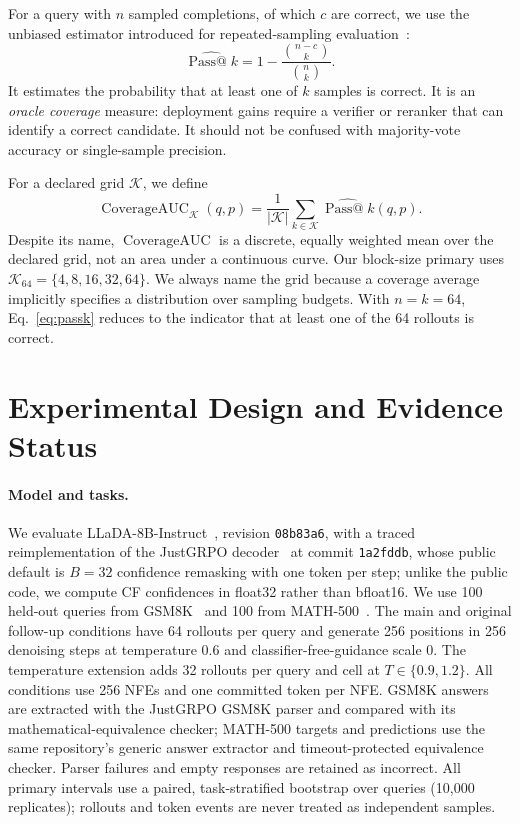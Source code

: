 \documentclass[11pt]{article}
\newcommand{\cauc}{\operatorname{CoverageAUC}}
\newcommand{\model}{LLaDA-8B-Instruct}
\newcommand{\gsm}{GSM8K}
\newcommand{\mathfive}{MATH-500}
\begin{document}
For a query with $n$ sampled completions, of which $c$ are correct, we use the unbiased estimator introduced for repeated-sampling evaluation~\citep{chen2021codex}:
\begin{equation}
  \widehat{\operatorname{Pass@}k}
  = 1-\frac{\binom{n-c}{k}}{\binom{n}{k}}.
  \label{eq:passk}
\end{equation}
It estimates the probability that at least one of $k$ samples is correct. It is an \emph{oracle coverage} measure: deployment gains require a verifier or reranker that can identify a correct candidate. It should not be confused with majority-vote accuracy or single-sample precision.

For a declared grid $\mathcal{K}$, we define
\begin{equation}
  \cauc_{\mathcal{K}}(q,p)=\frac{1}{|\mathcal{K}|}\sum_{k\in\mathcal{K}}\widehat{\operatorname{Pass@}k}(q,p).
  \label{eq:cauc}
\end{equation}
Despite its name, $\cauc$ is a discrete, equally weighted mean over the declared grid, not an area under a continuous curve. Our block-size primary uses $\mathcal{K}_{64}=\{4,8,16,32,64\}$. We always name the grid because a coverage average implicitly specifies a distribution over sampling budgets. With $n=k=64$, Eq.~\eqref{eq:passk} reduces to the indicator that at least one of the 64 rollouts is correct.

\section{Experimental Design and Evidence Status}
\label{sec:design}

\paragraph{Model and tasks.}
We evaluate \model{}~\citep{nie2025llada}, revision \texttt{08b83a6}, with a traced reimplementation of the JustGRPO decoder~\citep{ni2026flexibility} at commit \texttt{1a2fddb}, whose public default is $B=32$ confidence remasking with one token per step; unlike the public code, we compute CF confidences in float32 rather than bfloat16. We use 100 held-out queries from \gsm{}~\citep{cobbe2021gsm8k} and 100 from \mathfive{}~\citep{hendrycks2021math}. The main and original follow-up conditions have 64 rollouts per query and generate 256 positions in 256 denoising steps at temperature $0.6$ and classifier-free-guidance scale $0$. The temperature extension adds 32 rollouts per query and cell at $T\in\{0.9,1.2\}$. All conditions use 256 NFEs and one committed token per NFE. GSM8K answers are extracted with the JustGRPO GSM8K parser and compared with its mathematical-equivalence checker; MATH-500 targets and predictions use the same repository's generic answer extractor and timeout-protected equivalence checker. Parser failures and empty responses are retained as incorrect. All primary intervals use a paired, task-stratified bootstrap over queries (10,000 replicates); rollouts and token events are never treated as independent samples.
\end{document}
